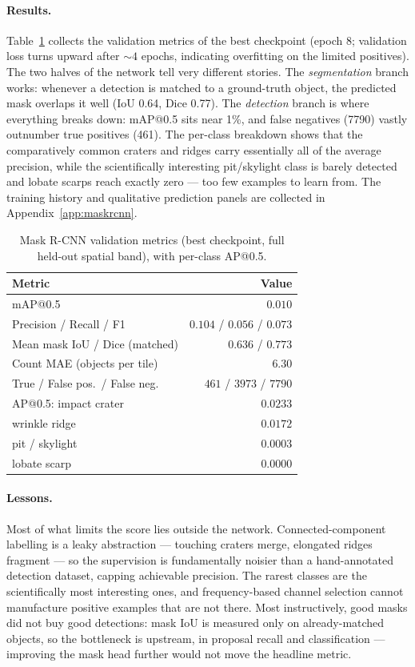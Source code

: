 \paragraph{Results.}
Table~\ref{tab:metrics} collects the validation metrics of the best checkpoint (epoch 8; validation loss turns upward after ${\sim}4$ epochs, indicating overfitting on the limited positives). The two halves of the network tell very different stories. The \emph{segmentation} branch works: whenever a detection is matched to a ground-truth object, the predicted mask overlaps it well (IoU 0.64, Dice 0.77). The \emph{detection} branch is where everything breaks down: mAP@0.5 sits near 1\%, and false negatives (7790) vastly outnumber true positives (461). The per-class breakdown shows that the comparatively common craters and ridges carry essentially all of the average precision, while the scientifically interesting pit/skylight class is barely detected and lobate scarps reach exactly zero --- too few examples to learn from. The training history and qualitative prediction panels are collected in Appendix~\ref{app:maskrcnn}.

\begin{table}[htbp]
\caption{Mask R-CNN validation metrics (best checkpoint, full held-out spatial band), with per-class AP@0.5.}
\label{tab:metrics}
\centering
\small
\begin{tabular}{l r}
\toprule
Metric & Value \\
\midrule
mAP@0.5                       & $0.010$ \\
Precision / Recall / F1       & $0.104$ / $0.056$ / $0.073$ \\
Mean mask IoU / Dice (matched) & $0.636$ / $0.773$ \\
Count MAE (objects per tile)  & $6.30$ \\
True / False pos.\ / False neg.\ & $461$ / $3973$ / $7790$ \\
\midrule
AP@0.5: impact crater          & $0.0233$ \\
\phantom{AP@0.5:} wrinkle ridge   & $0.0172$ \\
\phantom{AP@0.5:} pit / skylight  & $0.0003$ \\
\phantom{AP@0.5:} lobate scarp    & $0.0000$ \\
\bottomrule
\end{tabular}
\end{table}

\paragraph{Lessons.}
Most of what limits the score lies outside the network. Connected-component labelling is a leaky abstraction --- touching craters merge, elongated ridges fragment --- so the supervision is fundamentally noisier than a hand-annotated detection dataset, capping achievable precision. The rarest classes are the scientifically most interesting ones, and frequency-based channel selection cannot manufacture positive examples that are not there. Most instructively, good masks did not buy good detections: mask IoU is measured only on already-matched objects, so the bottleneck is upstream, in proposal recall and classification --- improving the mask head further would not move the headline metric.
